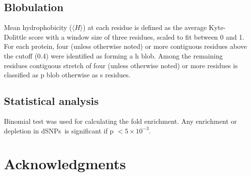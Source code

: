 \documentclass[10pt,letterpaper]{article}
\newcommand{\dSNPs}{dSNPs~}
\begin{document}
\subsection*{Blobulation} Mean hydrophobicity ($\langle H\rangle$) at each residue is defined as the average Kyte-Dolittle\cite{Kyte1982a} score with a window size of three residues, scaled to fit between 0 and 1. For each protein, four (unless otherwise noted) or more contiguous residues above the cutoff (0.4) were identified as forming a h blob. Among the remaining residues contiguous stretch of four (unless otherwise noted) or more residues is classified as p blob otherwise as s residues.  

\subsection*{Statistical analysis} Binomial test was used for calculating the fold enrichment. Any enrichment or depletion in \dSNPs is significant if p $< 5\times10^{-3}$.

\section*{Acknowledgments}

\end{document}
